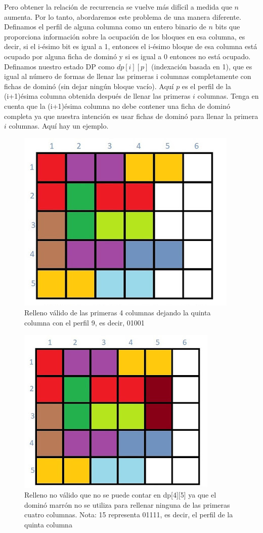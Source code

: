 Pero obtener la relación de recurrencia se vuelve más difícil a medida que $n$ aumenta. Por lo tanto, abordaremos este problema de una manera diferente. Definamos el perfil de alguna columna como un entero binario de $n$ bits que proporciona información sobre la ocupación de los bloques en esa columna, es decir, si el i-ésimo bit es igual a 1, entonces el i-ésimo bloque de esa columna está ocupado por alguna ficha de dominó y si es igual a 0 entonces no está ocupado. Definamos nuestro estado DP como $dp[i][p]$ (indexación basada en 1), que es igual al número de formas de llenar las primeras i columnas completamente con fichas de dominó (sin dejar ningún bloque vacío). Aquí $p$ es el perfil de la (i+1)ésima columna obtenida después de llenar las primeras $i$ columnas. Tenga en cuenta que la (i+1)ésima columna no debe contener una ficha de dominó completa ya que nuestra intención es usar fichas de dominó para llenar la primera $i$ columnas. Aquí hay un ejemplo.

\begin{figure}[!h]
	\centering
	\includegraphics[width=0.5\linewidth]{img/counting_tiling_1}
	\caption{Relleno válido de las primeras 4 columnas dejando la quinta columna con el perfil 9, es decir, 01001}
	\label{fig:countingtiling1}
\end{figure}

\begin{figure}[!h]
	\centering
	\includegraphics[width=0.5\linewidth]{img/counting_tiling_2}
	\caption{Relleno no válido que no se puede contar en dp[4][5] ya que el dominó marrón no se utiliza para rellenar ninguna de las primeras cuatro columnas. Nota: 15 representa 01111, es decir, el perfil de la quinta columna}
	\label{fig:countingtiling2}
\end{figure}

